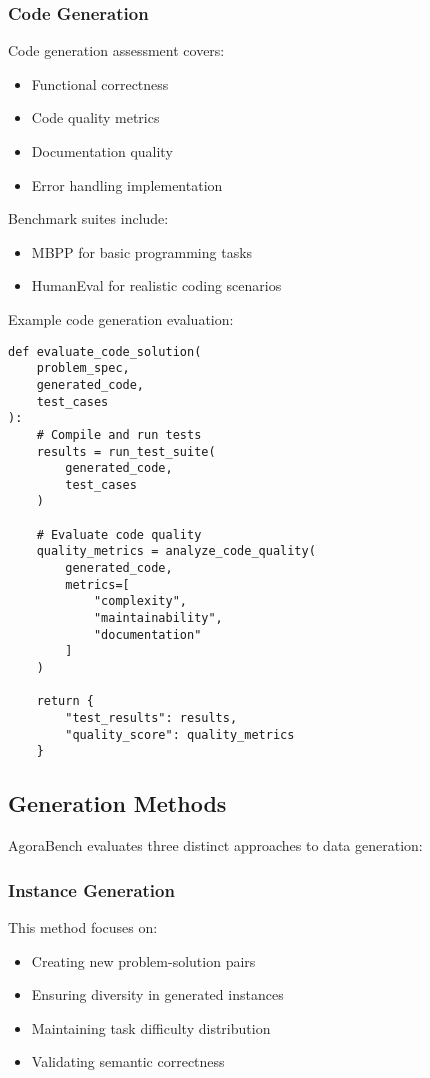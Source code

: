 \documentclass[10pt,conference]{IEEEtran}
\begin{document}
\subsubsection{Code Generation}
Code generation assessment covers:
\begin{itemize}
    \item Functional correctness
    \item Code quality metrics
    \item Documentation quality
    \item Error handling implementation
\end{itemize}

Benchmark suites include:
\begin{itemize}
    \item MBPP for basic programming tasks
    \item HumanEval for realistic coding scenarios
\end{itemize}

Example code generation evaluation:
\begin{lstlisting}
def evaluate_code_solution(
    problem_spec,
    generated_code,
    test_cases
):
    # Compile and run tests
    results = run_test_suite(
        generated_code,
        test_cases
    )
    
    # Evaluate code quality
    quality_metrics = analyze_code_quality(
        generated_code,
        metrics=[
            "complexity",
            "maintainability",
            "documentation"
        ]
    )
    
    return {
        "test_results": results,
        "quality_score": quality_metrics
    }
\end{lstlisting}

\subsection{Generation Methods}
AgoraBench evaluates three distinct approaches to data generation:

\subsubsection{Instance Generation}
This method focuses on:
\begin{itemize}
    \item Creating new problem-solution pairs
    \item Ensuring diversity in generated instances
    \item Maintaining task difficulty distribution
    \item Validating semantic correctness
\end{itemize}
\end{document}
